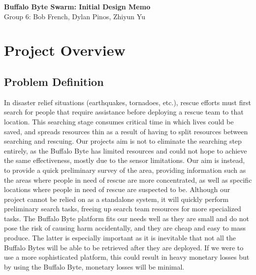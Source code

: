 \documentclass[10pt]{article}
\begin{document}
\begin{center}
	\Large\textbf{Buffalo Byte Swarm: Initial Design Memo}\\[0.1in]
	\large Group 6: Bob French, Dylan Pinos, Zhiyun Yu
\end{center}

\section*{Project Overview}
\subsection*{Problem Definition}
In disaster relief situations (earthquakes, tornadoes, etc.), rescue efforts must first search for people that require assistance before deploying a rescue team to that location. This searching stage consumes critical time in which lives could be saved, and spreads resources thin as a result of having to split resources between searching and rescuing. Our projects aim is not to eliminate the searching step entirely, as the Buffalo Byte has limited resources and could not hope to achieve the same effectiveness, mostly due to the sensor limitations. Our aim is instead, to provide a quick preliminary survey of the area, providing information such as the areas where people in need of rescue are more concentrated, as well as specific locations where people in need of rescue are suspected to be. Although our project cannot be relied on as a standalone system, it will quickly perform preliminary search tasks, freeing up search team resources for more specialized tasks. The Buffalo Byte platform fits our needs well as they are small and do not pose the risk of causing harm accidentally, and they are cheap and easy to mass produce. The latter is especially important as it is inevitable that not all the Buffalo Bytes will be able to be retrieved after they are deployed. If we were to use a more sophisticated platform, this could result in heavy monetary losses but by using the Buffalo Byte, monetary losses will be minimal.
\end{document}
